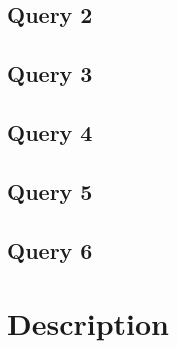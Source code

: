 \documentclass[12pt]{article}
\begin{document}
\subsection{Query 2}
\subsection{Query 3}
\subsection{Query 4}
\subsection{Query 5}
\subsection{Query 6}

\section{Description}
\end{document}

